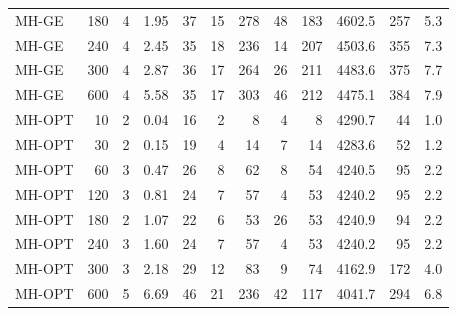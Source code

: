 \begin{table}[b]
\begin{tabular}{lrrr|rr|rrr|rrr}
MH-GE & 180 & 4 & 1.95 & 37 & 15 & 278 & 48 & 183 & 4602.5 & 257 & 5.3\\%
MH-GE & 240 & 4 & 2.45 & 35 & 18 & 236 & 14 & 207 & 4503.6 & 355 & 7.3\\%
MH-GE & 300 & 4 & 2.87 & 36 & 17 & 264 & 26 & 211 & 4483.6 & 375 & 7.7\\%
MH-GE & 600 & 4 & 5.58 & 35 & 17 & 303 & 46 & 212 & 4475.1 & 384 & 7.9\\%
MH-OPT & 10 & 2 & 0.04 & 16 & 2 & 8 & 4 & 8 & 4290.7 & 44 & 1.0\\%
MH-OPT & 30 & 2 & 0.15 & 19 & 4 & 14 & 7 & 14 & 4283.6 & 52 & 1.2\\%
MH-OPT & 60 & 3 & 0.47 & 26 & 8 & 62 & 8 & 54 & 4240.5 & 95 & 2.2\\%
MH-OPT & 120 & 3 & 0.81 & 24 & 7 & 57 & 4 & 53 & 4240.2 & 95 & 2.2\\%
MH-OPT & 180 & 2 & 1.07 & 22 & 6 & 53 & 26 & 53 & 4240.9 & 94 & 2.2\\%
MH-OPT & 240 & 3 & 1.60 & 24 & 7 & 57 & 4 & 53 & 4240.2 & 95 & 2.2\\%
MH-OPT & 300 & 3 & 2.18 & 29 & 12 & 83 & 9 & 74 & 4162.9 & 172 & 4.0\\%
MH-OPT & 600 & 5 & 6.69 & 46 & 21 & 236 & 42 & 117 & 4041.7 & 294 & 6.8\\%
\bottomrule
\end{tabular}
\end{table}
